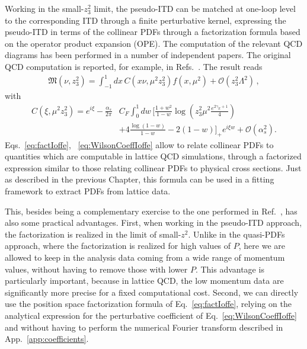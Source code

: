 Working in the small-$z_3^2$ limit, the pseudo-ITD can be matched at one-loop level to the corresponding ITD
through a finite perturbative kernel, expressing the pseudo-ITD in terms of the collinear PDFs through a factorization formula
based on the operator product expansion (OPE).  
The computation of the relevant QCD diagrams has been performed in a number of independent papers.
The original QCD computation is reported, for example, 
in Refs.~\cite{Radyushkin:2017lvu, Radyushkin:2016hsy, Izubuchi:2018srq, Ji:2017rah}.
The result reads
\begin{align}
	\label{eq:factIoffe}
	\mathfrak{M}\left(\nu, z_3^2\right) = \int_{-1}^{1} dx\,C\left(x\nu,\mu^2 z_3^2\right)f\left(x,\mu^2\right) + \mathcal{O}\left(z_3^2\Lambda^2\right)\,, 
\end{align}
with
\begin{align}
	\label{eq:WilsonCoeffIoffe}
	C\left(\xi,\mu^2 z_3^2\right) 
	= e^{i\xi} \nonumber -\frac{\alpha_s}{2\pi}& C_F \int_0^1 dw \, \biggl[\frac{1+w^2}{1-w} \log\left(z_3^2\mu^2\frac{e^{2\gamma_E + 1}}{4}\right) \nonumber \\
	&+4\frac{\log\left(1-w\right)}{1-w} -2\left(1-w\right)\biggr]_+ e^{i \xi w} + \mathcal{O}\left(\alpha_s^2\right).
\end{align}
Eqs.~\eqref{eq:factIoffe}, ~\eqref{eq:WilsonCoeffIoffe} allow to relate collinear PDFs to quantities
which are computable in lattice QCD simulations, through a factorized expression similar to those
relating collinear PDFs to physical cross sections. Just as described in the previous Chapter, 
this formula can be used in a fitting framework to extract PDFs from lattice data.

%
This, besides being a complementary exercise to the one performed in Ref.~\cite{Cichy2019}, has also some
practical advantages. First, when working in the pseudo-ITD approach, the factorization is realized in the limit of small-$z^2$.
Unlike in the quasi-PDFs approach, where the factorization is realized for high values of $P$,
here we are allowed to keep in the analysis data coming from a wide range of momentum values, 
without having to remove those with lower $P$.
This advantage is particularly important, because in lattice QCD, the low momentum data are significantly more precise for a fixed computational cost.
Second, we can directly use the position space factorization formula of Eq.~\eqref{eq:factIoffe}, relying on the analytical
expression for the perturbative coefficient of Eq.~\eqref{eq:WilsonCoeffIoffe} and without having
to perform the numerical Fourier transform described in App.~\ref{app:coefficients}.

